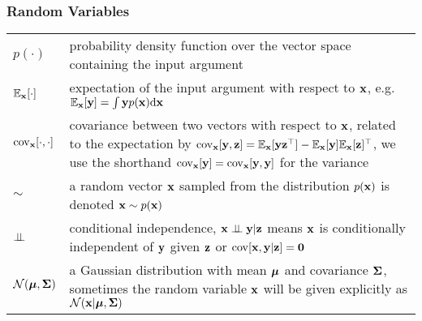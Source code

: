 \documentclass[a4paper,11pt,twoside,openright]{book}
\begin{document}
\subsubsection{Random Variables}
\begin{tabular}[]{p{}p{}}
$p(\cdot)$ & probability density function over the vector space containing the input argument \\[0.1cm]
%
$\mathbb{E}_{\mathbf{x}}[\cdot]$ & expectation of the input argument with respect to $\mathbf{x}$,  e.g.\ $\mathbb{E}_{\mathbf{x}}[\mathbf{y}] = \int\mathbf{y} p(\mathbf{x})\mathrm{d}\mathbf{x}$ \\[0.1cm]
%
$\mathrm{cov}_{\mathbf{x}}[\cdot,\cdot]$ & covariance between two vectors with respect to $\mathbf{x}$, related to the  expectation by $\mathrm{cov}_{\mathbf{x}}[\mathbf{y},\mathbf{z}] = \mathbb{E}_{\mathbf{x}}[\mathbf{y}\mathbf{z}^\top] -\mathbb{E}_{\mathbf{x}}[\mathbf{y}]\mathbb{E}_{\mathbf{x}}[\mathbf{z}]^\top$, we use the shorthand $\mathrm{cov}_{\mathbf{x}}[\mathbf{y}] = \mathrm{cov}_{\mathbf{x}}[\mathbf{y},\mathbf{y}]$ for the variance \\[0.1cm]
%
$\sim$  &  a random vector $\mathbf{x}$ sampled from the distribution $p(\mathbf{x})$ is denoted $\mathbf{x}\sim p(\mathbf{x})$ \\[0.1cm]
%
$\perp\!\!\!\perp$ & conditional independence, $\mathbf{x} \perp\!\!\!\perp \mathbf{y} | \mathbf{z}$ means $\mathbf{x}$ is conditionally independent of $\mathbf{y}$ given $\mathbf{z}$ or $\mathrm{cov}[\mathbf{x},\mathbf{y}|\mathbf{z}] = \mathbf{0}$ \\[0.1cm]
%
$\mathcal{N}(\boldsymbol{\mu},\boldsymbol{\Sigma})$ & a Gaussian distribution with mean $\boldsymbol{\mu}$ and covariance $\boldsymbol{\Sigma}$, sometimes the random variable $\mathbf{x}$ will be given explicitly as $\mathcal{N}(\mathbf{x}|\boldsymbol{\mu},\boldsymbol{\Sigma})$ 
\end{tabular}




\renewcommand{\contentsname}{C\lowercase{ontents}}
\tableofcontents







\mainmatter
\fancyhead[RE]{\bf\nouppercase{\leftmark}}
\fancyhead[LO]{\bf\nouppercase{\rightmark}}










\cleardoublepage
{}
\renewcommand{\bibname}{B\lowercase{ibliography}}


\end{document}
